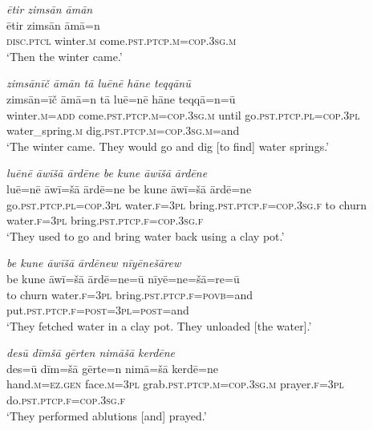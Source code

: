 \ea \label{ŽE.14}
\textit{ētir zimsān āmān} \\ 
\gll ētir zimsān āmā=n \\ 
 \textsc{disc.ptcl} winter\textsc{.m} come\textsc{.pst}\textsc{.ptcp}\textsc{.m}\textsc{=cop}\textsc{.3sg}\textsc{.m} \\ 
\glt `Then the winter came.'
\z 
 
\ea \label{ŽE.15}
\textit{zimsānīč āmān tā luēnē hāne teqqānū} \\ 
\gll zimsān=īč āmā=n tā luē=nē hāne teqqā=n=ū \\ 
 winter\textsc{.m}\textsc{=add} come\textsc{.pst}\textsc{.ptcp}\textsc{.m}\textsc{=cop}\textsc{.3sg}\textsc{.m} until go\textsc{.pst}\textsc{.ptcp}\textsc{.pl}\textsc{=cop}\textsc{.3pl} water\_spring\textsc{.m} dig\textsc{.pst}\textsc{.ptcp}\textsc{.m}\textsc{=cop}\textsc{.3sg}\textsc{.m}=and \\ 
\glt `The winter came. They would go and dig [to find] water springs.'
\z 
 
\ea \label{ŽE.16}
\textit{luēnē āwīšā ārdēne be kune āwīšā ārdēne} \\ 
\gll luē=nē āwī=šā ārdē=ne be kune āwī=šā ārdē=ne \\ 
 go\textsc{.pst}\textsc{.ptcp}\textsc{.pl}\textsc{=cop}\textsc{.3pl} water\textsc{.f}\textsc{=3pl} bring\textsc{.pst}\textsc{.ptcp}\textsc{.f}\textsc{=cop}\textsc{.3sg}\textsc{.f} to churn water\textsc{.f}\textsc{=3pl} bring\textsc{.pst}\textsc{.ptcp}\textsc{.f}\textsc{=cop}\textsc{.3sg}\textsc{.f} \\ 
\glt `They used to go and bring water back using a clay pot.'
\z 
 
\ea \label{ŽE.17}
\textit{be kune āwīšā ārdēnew nīyēnešārew} \\ 
\gll be kune āwī=šā ārdē=ne=ū nīyē=ne=šā=re=ū \\ 
 to churn water\textsc{.f}\textsc{=3pl} bring\textsc{.pst}\textsc{.ptcp}\textsc{.f}\textsc{=\textsc{povb}}=and put\textsc{.pst}\textsc{.ptcp}\textsc{.f}\textsc{=\textsc{post}}\textsc{=3pl}\textsc{=\textsc{post}}=and \\ 
\glt `They fetched water in a clay pot. They unloaded [the water].'
\z 
 
\ea \label{ŽE.18}
\textit{desū dīmšā gērten nimāšā kerdēne} \\ 
\gll des=ū dīm=šā gērte=n nimā=šā kerdē=ne \\ 
 hand\textsc{.m}\textsc{\textsc{=ez.gen}} face\textsc{.m}\textsc{=3pl} grab\textsc{.pst}\textsc{.ptcp}\textsc{.m}\textsc{=cop}\textsc{.3sg}\textsc{.m} prayer\textsc{.f}\textsc{=3pl} do\textsc{.pst}\textsc{.ptcp}\textsc{.f}\textsc{=cop}\textsc{.3sg}\textsc{.f} \\ 
\glt `They performed ablutions [and] prayed.'
\z 
 
